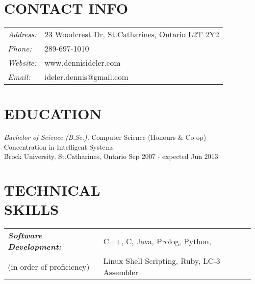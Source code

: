 \documentclass[margin]{res}
\begin{document}
\begin{resume}

\section{CONTACT INFO} %
\begin{tabular}{l l}
  {\sl Address:} & 23 Woodcrest Dr, St.\hspace{2 pt}Catharines, Ontario L2T 2Y2 \\
  {\sl Phone:} & 289-697-1010 \\
  {\sl Website:} & www.dennisideler.com \\ %
  {\sl Email:} & ideler.dennis@gmail.com
\end{tabular} 



\section{EDUCATION}
  {\sl Bachelor of Science (B.Sc.),} Computer Science (Honours \& Co-op) \\
  Concentration in Intelligent Systems \\
  Brock University, St.\hspace{2 pt}Catharines, Ontario
  \hfill Sep 2007 - expected Jun 2013 \\
                

\section{TECHNICAL \\ SKILLS}
	\begin{tabular}{l l}
	{\sl \textbf{Software Development:}} &
  C++, C, Java, Prolog, Python, \\ (in order of proficiency) &
  Linux Shell Scripting, Ruby, LC-3 Assembler \\


\end{tabular}
\end{resume}
\end{document}
